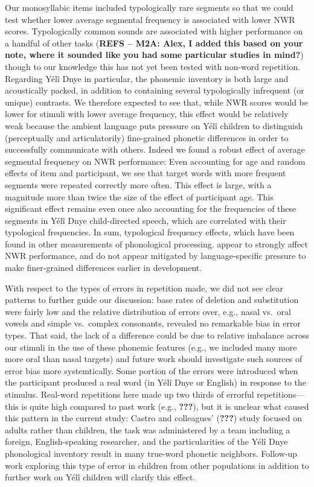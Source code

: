 \documentclass[english,,man,floatsintext]{apa6}
\begin{document}
Our monosyllabic items included typologically rare segments so that we
could test whether lower average segmental frequency is associated with
lower NWR scores. Typologically common sounds are associated with higher
performance on a handful of other tasks (\textbf{REFS -- M2A: Alex, I
added this based on your note, where it sounded like you had some
particular studies in mind?}) though to our knowledge this has not yet
been tested with non-word repetition. Regarding Yélî Dnye in particular,
the phonemic inventory is both large and acoustically packed, in
addition to containing several typologically infrequent (or unique)
contrasts. We therefore expected to see that, while NWR scores would be
lower for stimuli with lower average frequency, this effect would be
relatively weak because the ambient language puts pressure on Yélî
children to distinguish (perceptually and articulatorily) fine-grained
phonetic differences in order to successfully communicate with others.
Indeed we found a robust effect of average segmental frequency on NWR
performance: Even accounting for age and random effects of item and
participant, we see that target words with more frequent segments were
repeated correctly more often. This effect is large, with a magnitude
more than twice the size of the effect of participant age. This
significant effect remains even once also accounting for the frequencies
of these segments in Yélî Dnye child-directed speech, which are
correlated with their typological frequencies. In sum, typological
frequency effects, which have been found in other measurements of
phonological processing. appear to strongly affect NWR performance, and
do not appear mitigated by language-specific pressure to make
finer-grained differences earlier in development.

With respect to the types of errors in repetition made, we did not see
clear patterns to further guide our discussion: base rates of deletion
and substitution were fairly low and the relative distribution of errors
over, e.g., nasal vs.~oral vowels and simple vs.~complex consonants,
revealed no remarkable bias in error types. That said, the lack of a
difference could be due to relative imbalance across our stimuli in the
use of these phonemic features (e.g., we included many more more oral
than nasal targets) and future work should investigate such sources of
error bias more systemtically. Some portion of the errors were
introduced when the participant produced a real word (in Yélî Dnye or
English) in response to the stimulus. Real-word repetitions here made up
two thirds of errorful repetitions---this is quite high compared to past
work (e.g., {\textbf{???}}), but it is unclear what caused this pattern
in the current study: Castro and colleagues' ({\textbf{???}}) study
focused on adults rather than children, the task was administered by a
team including a foreign, English-speaking researcher, and the
particularities of the Yélî Dnye phonological inventory result in many
true-word phonetic neighbors. Follow-up work exploring this type of
error in children from other populations in addition to further work on
Yélî children will clarify this effect.
\end{document}
